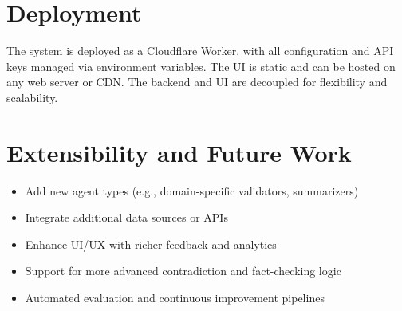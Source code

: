 \documentclass{article}
\begin{document}
\section*{Deployment}
The system is deployed as a Cloudflare Worker, with all configuration and API keys managed via environment variables. The UI is static and can be hosted on any web server or CDN. The backend and UI are decoupled for flexibility and scalability.

\section*{Extensibility and Future Work}
\begin{itemize}[leftmargin=*, itemsep=0.5em]
  \item Add new agent types (e.g., domain-specific validators, summarizers)
  \item Integrate additional data sources or APIs
  \item Enhance UI/UX with richer feedback and analytics
  \item Support for more advanced contradiction and fact-checking logic
  \item Automated evaluation and continuous improvement pipelines
\end{itemize}
\end{document}
